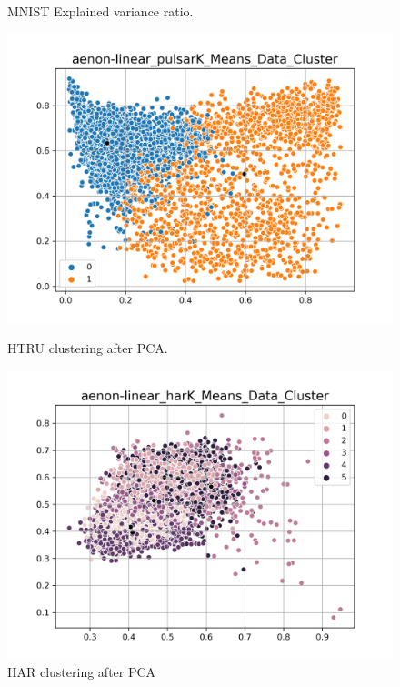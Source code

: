 \documentclass[journal]{IEEEtran}
\begin{document}
\begin{figure}[!htb]
    \caption{MNIST Explained variance ratio.}\label{fig_aelinear_mnistData_Cluster}
  \endminipage
  \end{figure}

\begin{figure}[!htb]
    \includegraphics[width=\linewidth]{images/aenon-linear_pulsarK_Means_Data_Cluster.png}
    \caption{HTRU clustering after PCA.}\label{fig_linear_pulsarK_Means_Data_Cluster}
  \endminipage\hfill
    \includegraphics[width=\linewidth]{images/aenon-linear_harK_Means_Data_Cluster.png}
    \caption{HAR clustering after PCA}\label{fig_aenon-linear_harK_Means_Data_Cluster}
  \endminipage\hfill

\end{figure}
\end{document}
